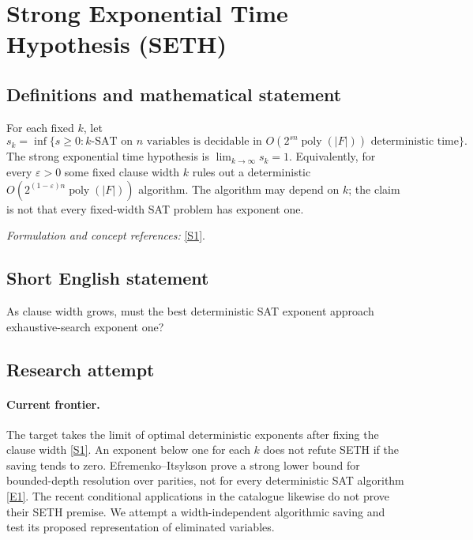 \documentclass[11pt,a4paper]{article}
\newcommand{\sref}[2]{\hyperlink{source:#1:#2}{[S#2]}}
\newcommand{\eref}[2]{\hyperlink{extra:#1:#2}{[E#2]}}
\newif\ifshowcatalogue
\newcommand{\cataloguescope}[1]{\ifshowcatalogue
 \paragraph{Exact scope in the supplied catalogue.}
 \begin{quote}\small #1\end{quote}\fi}
\numberwithin{equation}{section}
\begin{document}
\setcounter{section}{0}
\clearpage
\section*{\texorpdfstring{Strong Exponential Time Hypothesis (SETH)}{Strong Exponential Time Hypothesis (SETH)}}\label{statement}
\subsection{Definitions and mathematical statement}
For each fixed $k$, let
\[
 s_k=\inf\{s\ge0:k\text{-SAT on }n\text{ variables is decidable in }
 O(2^{sn}\operatorname{poly}(|F|))\text{ deterministic time}\}.
\]
The strong exponential time hypothesis is $\lim_{k\to\infty}s_k=1$. Equivalently, for every $\varepsilon>0$ some fixed clause width $k$ rules out a deterministic $O(2^{(1-\varepsilon)n}\operatorname{poly}(|F|))$ algorithm. The algorithm may depend on $k$; the claim is not that every fixed-width SAT problem has exponent one.
\par\smallskip\textit{Formulation and concept references:} \sref{statement}{1}.
\cataloguescope{Prove or disprove that the optimal exponent s\_k for k-SAT satisfies lim\_\{k to infinity\} s\_k = 1.}
\subsection{Short English statement}
As clause width grows, must the best deterministic SAT exponent approach exhaustive-search exponent one?
\subsection{Research attempt}

\paragraph{Current frontier.}
The target takes the limit of optimal deterministic exponents after fixing the clause width \sref{statement}{1}. An exponent below one for each $k$ does not refute SETH if the saving tends to zero. Efremenko--Itsykson prove a strong lower bound for bounded-depth resolution over parities, not for every deterministic SAT algorithm \eref{statement}{1}. The recent conditional applications in the catalogue likewise do not prove their SETH premise. We attempt a width-independent algorithmic saving and test its proposed representation of eliminated variables.
\end{document}
